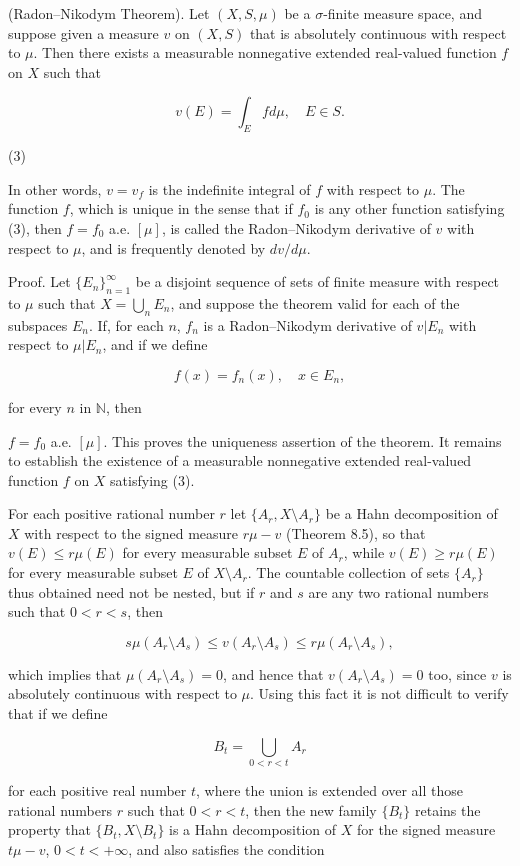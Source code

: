 (Radon–Nikodym Theorem). Let $(X, S, \mu)$ be a $\sigma$-finite measure space, and suppose given a measure $v$ on $(X, S)$ that is absolutely continuous with respect to $\mu$. Then there exists a measurable nonnegative extended real-valued function $f$ on $X$ such that

$$v(E) = \int_E f d\mu, \quad E \in S.$$  

(3)

In other words, $v = v_f$ is the indefinite integral of $f$ with respect to $\mu$. The function $f$, which is unique in the sense that if $f_0$ is any other function satisfying (3), then $f = f_0$ a.e. $[\mu]$, is called the Radon–Nikodym derivative of $v$ with respect to $\mu$, and is frequently denoted by $dv/d\mu$.

Proof. Let $\{E_n\}_{n=1}^{\infty}$ be a disjoint sequence of sets of finite measure with respect to $\mu$ such that $X = \bigcup_n E_n$, and suppose the theorem valid for each of the subspaces $E_n$. If, for each $n$, $f_n$ is a Radon–Nikodym derivative of $v|E_n$ with respect to $\mu|E_n$, and if we define

$$f(x) = f_n(x), \quad x \in E_n,$$

for every $n$ in $\mathbb{N}$, then

$f = f_0$ a.e. $[\mu]$. This proves the uniqueness assertion of the theorem. It remains to establish the existence of a measurable nonnegative extended real-valued function $f$ on $X$ satisfying (3).

For each positive rational number $r$ let $\{A_r, X \setminus A_r\}$ be a Hahn decomposition of $X$ with respect to the signed measure $r\mu - v$ (Theorem 8.5), so that $v(E) \leq r\mu(E)$ for every measurable subset $E$ of $A_r$, while $v(E) \geq r\mu(E)$ for every measurable subset $E$ of $X \setminus A_r$. The countable collection of sets $\{A_r\}$ thus obtained need not be nested, but if $r$ and $s$ are any two rational numbers such that $0 < r < s$, then

$$s\mu(A_r \setminus A_s) \leq v(A_r \setminus A_s) \leq r\mu(A_r \setminus A_s),$$

which implies that $\mu(A_r \setminus A_s) = 0$, and hence that $v(A_r \setminus A_s) = 0$ too, since $v$ is absolutely continuous with respect to $\mu$. Using this fact it is not difficult to verify that if we define

$$B_t = \bigcup_{0 < r < t} A_r$$

for each positive real number $t$, where the union is extended over all those rational numbers $r$ such that $0 < r < t$, then the new family $\{B_t\}$ retains the property that $\{B_t, X \setminus B_t\}$ is a Hahn decomposition of $X$ for the signed measure $t\mu - v$, $0 < t < +\infty$, and also satisfies the condition

